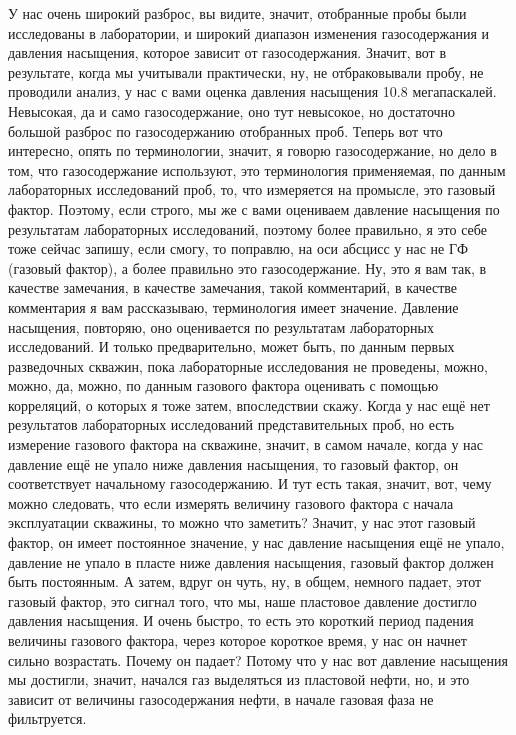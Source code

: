 \documentclass[main.tex]{subfiles}
\begin{document}
У нас очень широкий разброс, вы видите, значит, отобранные пробы были исследованы в лаборатории, и широкий диапазон изменения газосодержания и давления насыщения, которое зависит от газосодержания.
Значит, вот в результате, когда мы учитывали практически, ну, не отбраковывали пробу, не проводили анализ, у нас с вами оценка давления насыщения 10.8 мегапаскалей.
Невысокая, да и само газосодержание, оно тут невысокое, но достаточно большой разброс по газосодержанию отобранных проб.
Теперь вот что интересно, опять по терминологии, значит, я говорю газосодержание, но дело в том, что газосодержание используют, это терминология применяемая, по данным лабораторных исследований проб, то, что измеряется на промысле, это газовый фактор.
Поэтому, если строго, мы же с вами оцениваем давление насыщения по результатам лабораторных исследований, поэтому более правильно, я это себе тоже сейчас запишу, если смогу, то поправлю, на оси абсцисс у нас не ГФ (газовый фактор), а более правильно это газосодержание.
Ну, это я вам так, в качестве замечания, в качестве замечания, такой комментарий, в качестве комментария я вам рассказываю, терминология имеет значение.
Давление насыщения, повторяю, оно оценивается по результатам лабораторных исследований.
И только предварительно, может быть, по данным первых разведочных скважин, пока лабораторные исследования не проведены, можно, можно, да, можно, по данным газового фактора оценивать с помощью корреляций, о которых я тоже затем, впоследствии скажу.
Когда у нас ещё нет результатов лабораторных исследований представительных проб, но есть измерение газового фактора на скважине, значит, в самом начале, когда у нас давление ещё не упало ниже давления насыщения, то газовый фактор, он соответствует начальному газосодержанию.
И тут есть такая, значит, вот, чему можно следовать, что если измерять величину газового фактора с начала эксплуатации скважины, то можно что заметить?
Значит, у нас этот газовый фактор, он имеет постоянное значение, у нас давление насыщения ещё не упало, давление не упало в пласте ниже давления насыщения, газовый фактор должен быть постоянным.
А затем, вдруг он чуть, ну, в общем, немного падает, этот газовый фактор, это сигнал того, что мы, наше пластовое давление достигло давления насыщения.
И очень быстро, то есть это короткий период падения величины газового фактора, через которое короткое время, у нас он начнет сильно возрастать.
Почему он падает?
Потому что у нас вот давление насыщения мы достигли, значит, начался газ выделяться из пластовой нефти, но, и это зависит от величины газосодержания нефти, в начале газовая фаза не фильтруется.
\end{document}
